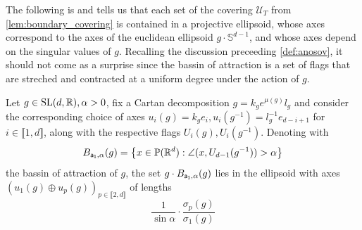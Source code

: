 \documentclass{report}
\begin{document}
The following is \cite[Proposition 3.8]{pozzetti_anosov_2023} and tells us that each set of the covering $\mathcal U_T$ from \cref{lem:boundary_covering} is contained in a projective ellipsoid, whose axes correspond to the axes of the euclidean ellipsoid $g \cdot \mathbb S^{d-1}$, and whose axes depend on the singular values of $g$.
Recalling the discussion preceeding \cref{def:anosov}, it should not come as a surprise since the bassin of attraction is a set of flags that are streched and contracted at a uniform degree under the action of $g$.
\begin{proposition}\label{prop:basin_covering}
Let $g \in \operatorname{{\mathrm{SL}}}(d, \mathbb R), \alpha > 0$, fix a Cartan decomposition $g = k_g e^{\mu(g)} l_g$ and consider the corresponding choice of axes $u_i(g) = k_g e_i, u_i(g^{-1}) = l_g^{-1} e_{d-i+1}$ for $i \in \llbracket 1, d \rrbracket$, along with the respective flags $U_i(g), U_i(g^{-1})$.
Denoting with
\[
B_{{\sf a_1}, \alpha}(g) = \left\{ x \in \mathbb P(\mathbb R^d) : \angle(x, U_{d-1}(g^{-1})) > \alpha \right\}
\]
the bassin of attraction of $g$, the set $g \cdot B_{{\sf a_1}, \alpha}(g)$ lies in the ellipsoid with axes $\left(u_1(g) \oplus u_p(g)\right)_{p \in \llbracket 2, d \rrbracket}$ of lengths
\[
    \frac{1}{\sin \alpha} \cdot \frac{\sigma_p(g)}{\sigma_1(g)}
\]
\end{proposition}
\end{document}
